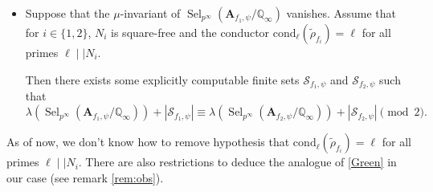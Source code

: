 \documentclass{amsart}
\newcommand{\Q}{\mathbb{Q}}
\newcommand{\bA}{\mathbf{A}}
\newcommand{\Sel}{\operatorname{Sel}}
\newtheorem{auxiliary proposition}[theorem]{Auxiliary Proposition}
\newtheorem{main conjecture}[theorem]{Main Conjecture}
\newtheorem{main theorem}[theorem]{Main Theorem}
\newtheorem{modesty proposition}[theorem]{Modesty Proposition}
\newtheorem{open problem}[theorem]{Open Problem}
\newtheorem{convergence lemma}[theorem]{Convergence Lemma}
\newtheorem{corrected lemma}[theorem]{Corrected Lemma}
\newtheorem{growth lemma}[theorem]{Growth Lemma}
\newtheorem{coefficient lemma}[theorem]{Integrality Lemma}
\newtheorem{interpolation lemma}[theorem]{Interpolation Lemma}
\newtheorem{kernel lemma}[theorem]{Kernel Lemma}
\newtheorem{limit lemma}[theorem]{Limit Lemma}
\newtheorem{tandem lemma}[theorem]{Modesty Lemma}
\newtheorem{zero-finding lemma}[theorem]{Zero-Finding Lemma}
\begin{document}
\begin{itemize}
    \item Suppose that the $\mu$-invariant of $\Sel_{p^\infty}(\bA_{f_1,\psi}/\Q_\infty)$ vanishes. Assume that for $i\in \{1,2\}$, $N_i$ is square-free and the conductor $\mathrm{cond}_\ell(\tilde{\rho}_{f_i})=\ell$ for all primes $\ell \mid \mid N_i$.
    
    Then there exists some explicitly computable finite sets $\mathcal{S}_{f_1,\psi}$ and $\mathcal{S}_{f_2,\psi}$  such that $$\lambda(\Sel_{p^\infty}(\bA_{f_1, \psi}/\Q_\infty))+|\mathcal{S}_{f_1,\psi}|\equiv \lambda(\Sel_{p^\infty}(\bA_{f_2, \psi}/\Q_\infty))+|\mathcal{S}_{f_2,\psi}| \pmod{2}.$$
\end{itemize}



 As of now, we don't know how to remove hypothesis that $\mathrm{cond}_\ell(\tilde{\rho}_{f_i})=\ell$ for all primes $\ell \mid \mid N_i$.
  There are also restrictions to deduce the analogue of \eqref{Green} in our case (see remark \ref{rem:obs}).
\end{document}

